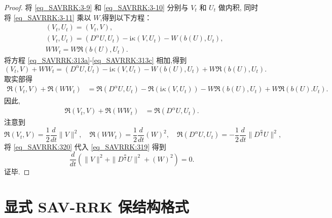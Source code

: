 \begin{proof}
	将 \eqref{eq_SAVRRK:3-9} 和 \eqref{eq_SAVRRK:3-10} 分别与 $V_t$ 和 $U_t$ 做内积, 
	同时将 \eqref{eq_SAVRRK:3-11} 乘以 $W$,得到以下方程：
\begin{align}
&\left(V_t, U_t\right)=\left(V_t, V\right), \label{eq_SAVRRK:313a}\\
&\left(V_t, U_t\right)=\left(D^{\alpha} U, U_t\right)-\mathrm{i} \kappa\left(V, U_t\right)-W\left(b(U), U_t\right), \label{eq_SAVRRK:313b}\\
&W W_t=W\Re\left(b(U), U_t\right).\label{eq_SAVRRK:313c}
\end{align}
将方程 \eqref{eq_SAVRRK:313a}-\eqref{eq_SAVRRK:313c} 相加,得到
\begin{equation}
\left(V_t, V\right) + W W_t= \left(D^{\alpha} U, U_t\right)-\mathrm{i} \kappa\left(V, U_t\right)-W\left(b(U), U_t\right) + W\Re\left(b(U), U_t\right).
\end{equation}
取实部得
\begin{align}
\Re\left(V_t, V\right) + \Re\left(W W_t\right)&= \Re\left(D^{\alpha} U, U_t\right)-\Re\left(\mathrm{i} \kappa\left(V, U_t\right)\right)-W\Re\left(b(U), U_t\right) + W\Re\left(b(U). U_t\right).
\end{align}
因此,
\begin{align}
\Re\left(V_t, V\right) + \Re\left(W W_t\right)&= \Re\left(D^{\alpha} U, U_t\right).\label{eq_SAVRRK:319}
\end{align}
注意到
\begin{equation}
\Re\left(V_t, V\right) = \frac{1}{2}\frac{d }{d t}\|V\|^2, \quad \Re\left(W W_t\right) = \frac{1}{2}\frac{d }{d t}\left(W\right)^2,\quad \Re\left(D^{\alpha} U, U_t\right)=-\frac{1}{2}\frac{d }{d t}\|D^\frac{\alpha}{2}U\|^2,\label{eq_SAVRRK:320}
\end{equation}
将 \eqref{eq_SAVRRK:320} 代入 \eqref{eq_SAVRRK:319} 得到
\begin{equation}
\frac{d }{d t}\left(\|V\|^2+\|D^\frac{\alpha}{2}U\|^2+\left(W\right)^2\right)=0.
\end{equation}
证毕.
\end{proof}

\section{显式 SAV-RRK 保结构格式}\label{Section_SAVRRK: 4}

